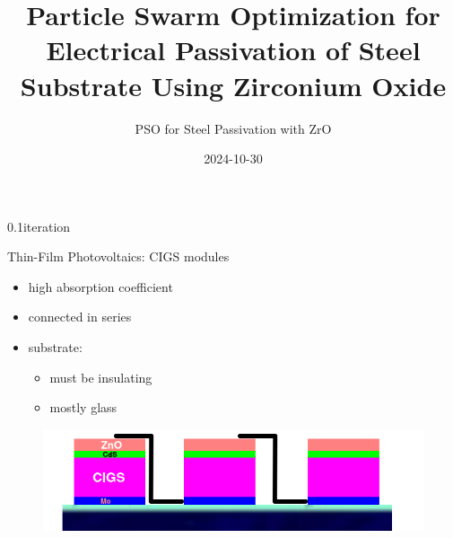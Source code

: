 \documentclass[hyperref={pdfpagelabels=false}, aspectratio=43, t]{beamer}  %
\title{Particle Swarm Optimization for Electrical Passivation of Steel Substrate Using Zirconium Oxide} %
\subtitle{PSO for Steel Passivation with ZrO}  %
\date{2024-10-30} %
\begin{document}

\maketitle

													



\begin{graphicsFrame}{}{}{0.1}{}{iteration}{}\end{graphicsFrame}

\begin{frame}{Thin-Film Photovoltaics: CIGS modules}
	\begin{itemize}
		\item high absorption coefficient
		\item connected in series 
		\item substrate:
			\begin{itemize}
				\item must be insulating 
				\item mostly glass
			\end{itemize}
	\end{itemize}
	\begin{figure}
		\includegraphics[width=.9\textwidth]{figures/cigs_mod.png}
	\end{figure}
\end{frame}
\end{document}
